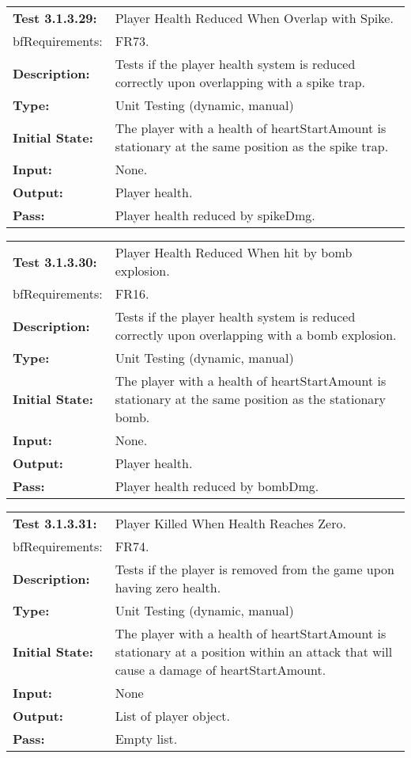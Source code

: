 \documentclass[12pt, titlepage]{article}
\begin{document}
\begin{tabular}{|l|p{10cm}|}
    \hline
    \bf{Test} 3.1.3.29: & Player Health Reduced When Overlap with Spike.\\
    bf{Requirements}: & FR73. \\
    \bf{Description}: & Tests if the player health system is reduced correctly upon overlapping with a spike trap. \\
    \bf{Type}: & Unit Testing (dynamic, manual) \\
    \bf{Initial State}: & The player with a health of heartStartAmount is stationary at the same position as the spike trap.\\
    \bf{Input}: & None.\\
    \bf{Output}: & Player health.\\
    \bf{Pass}: & Player health reduced by spikeDmg.\\
    \hline
\end{tabular}

\begin{tabular}{|l|p{10cm}|}
    \hline
    \bf{Test} 3.1.3.30: & Player Health Reduced When hit by bomb explosion.\\
    bf{Requirements}: & FR16. \\
    \bf{Description}: & Tests if the player health system is reduced correctly upon overlapping with a bomb explosion. \\
    \bf{Type}: & Unit Testing (dynamic, manual) \\
    \bf{Initial State}: & The player with a health of heartStartAmount is stationary at the same position as the stationary bomb.\\
    \bf{Input}: & None.\\
    \bf{Output}: & Player health.\\
    \bf{Pass}: & Player health reduced by bombDmg.\\
    \hline
\end{tabular}

\begin{tabular}{|l|p{10cm}|}
    \hline
    \bf{Test} 3.1.3.31: & Player Killed When Health Reaches Zero.\\
    bf{Requirements}: & FR74. \\
    \bf{Description}: & Tests if the player is removed from the game upon having zero health. \\
    \bf{Type}: & Unit Testing (dynamic, manual) \\
    \bf{Initial State}: & The player with a health of heartStartAmount is stationary at a position within an attack that will cause a damage of heartStartAmount.\\
    \bf{Input}: & None\\
    \bf{Output}: & List of player object.\\
    \bf{Pass}: & Empty list.\\
    \hline
\end{tabular}
\end{document}
